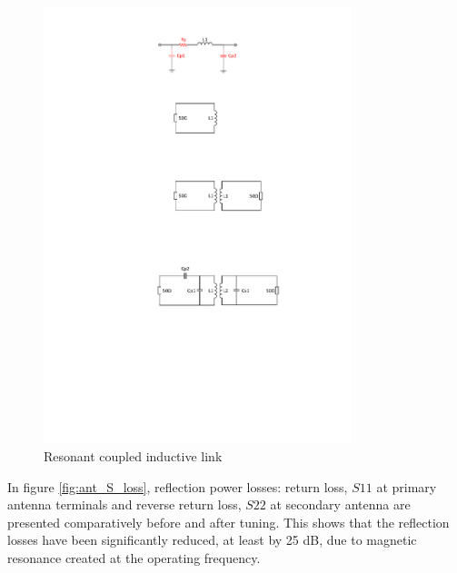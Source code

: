 \documentclass[UKenglish]{ifimaster}  %
\begin{document}
\begin{figure}[!htbp] %
   \centering
   \includegraphics[width=0.8\textwidth]{img/ant_couple_resonant.pdf} 
   \caption{Resonant coupled inductive link}
   \label{fig:ant_couple_resonant}
\end{figure}

In figure \ref{fig:ant_S_loss}, reflection power losses:  return loss, $S11$ at primary antenna terminals and reverse return loss, $S22$ at secondary antenna are presented comparatively before and after tuning. This shows that the reflection losses have been significantly reduced, at least by 25 dB, due to magnetic resonance created at the operating frequency. \\
\end{document}
